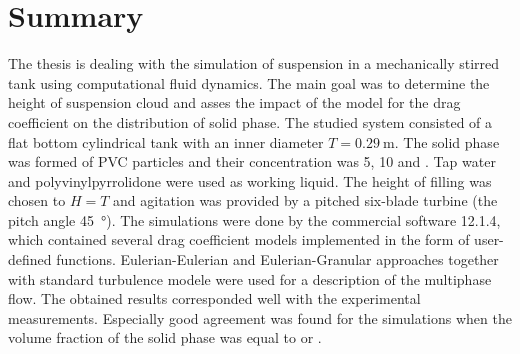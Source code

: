 \section*{Summary}
The thesis is dealing with the simulation of suspension in a mechanically stirred tank using computational fluid dynamics. The main goal was to determine the height of suspension cloud and asses the impact of the model for the drag coefficient on the distribution of solid phase. The studied system consisted of a flat bottom cylindrical tank with an inner diameter $T=\SI{0.29}{\meter}$. The solid phase was formed of PVC particles and their concentration was 5, 10 and . Tap water and polyvinylpyrrolidone were used as working liquid. The height of filling was chosen to $H=T$ and agitation was provided by a pitched six-blade turbine (the pitch angle \SI{45}{\degree}). The simulations were done by the commercial software \flu{} 12.1.4, which contained several drag coefficient models implemented in the form of user-defined functions. Eulerian-Eulerian and Eulerian-Granular approaches together with standard \keps{} turbulence modele were used for a description of the multiphase flow. The obtained results corresponded well with the experimental measurements. Especially good agreement was found for the simulations when the volume fraction of the solid phase was equal to  or .

